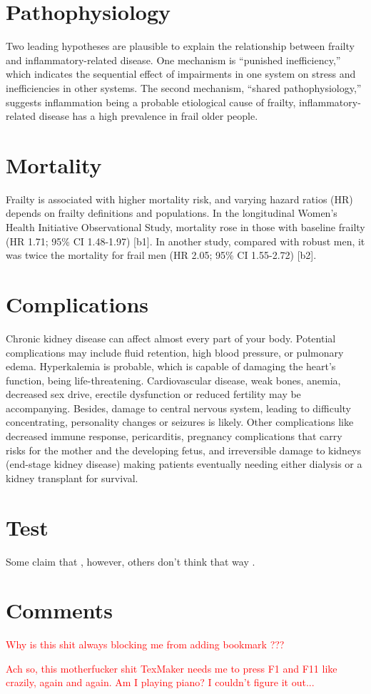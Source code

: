 \documentclass[jou]{apa6}
\begin{document}
\section{Pathophysiology}
Two leading hypotheses are plausible to explain the relationship between frailty and inflammatory-related disease.
One mechanism is “punished inefficiency,” which indicates the sequential effect of impairments in one system on stress and inefficiencies in other systems. The second mechanism, “shared pathophysiology,” suggests inflammation being a probable etiological cause of frailty, inflammatory-related disease has a high prevalence in frail older people.

\section{Mortality}
Frailty is associated with higher mortality risk, and varying hazard ratios (HR) depends on frailty definitions and populations. In the longitudinal Women’s Health Initiative Observational Study, mortality rose in those with baseline frailty (HR 1.71; 95\% CI 1.48-1.97) [b1]. In another study, compared with robust men, it was twice the mortality for frail men (HR 2.05; 95\% CI 1.55-2.72) [b2]. 

\section{Complications}
Chronic kidney disease can affect almost every part of your body. Potential complications may include fluid retention, high blood pressure, or pulmonary edema. Hyperkalemia is probable, which is capable of damaging the heart’s function, being life-threatening. Cardiovascular disease, weak bones, anemia, decreased sex drive, erectile dysfunction or reduced fertility may be accompanying. Besides, damage to central nervous system, leading to difficulty concentrating, personality changes or seizures is likely. Other complications like decreased immune response, pericarditis, pregnancy complications that carry risks for the mother and the developing fetus, and irreversible damage to kidneys (end-stage kidney disease) making patients eventually needing either dialysis or a kidney transplant for survival.

\section{Test}
Some claim that \cite{sanchez2017comparison}, however, others don't think that way \cite{mathiesen2019survival}.
\section{Comments}
\textcolor{red}{
Why is this shit always blocking me from adding bookmark \cite{studzinska2017atranorin}???

Ach so, this motherfucker shit TexMaker needs me to press F1 and F11 like crazily, again and again. Am I playing piano? I couldn't figure it out...}



\end{document}

